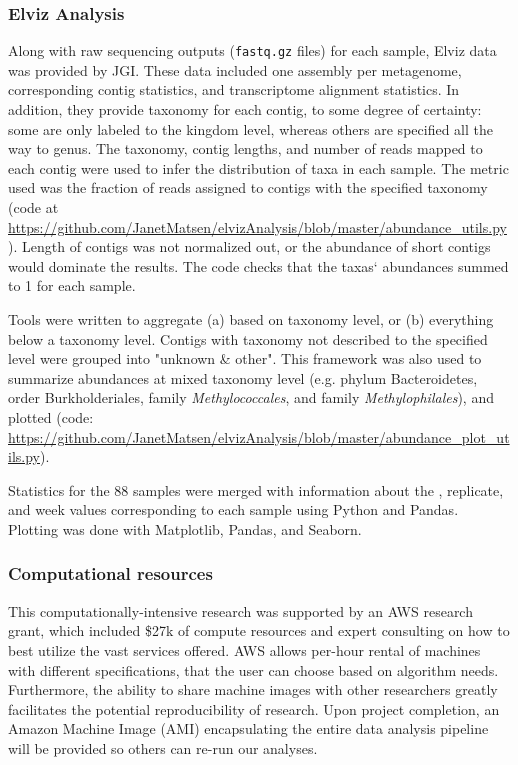 \subsubsection{Elviz Analysis}
Along with raw sequencing outputs (\texttt{fastq.gz} files) for each sample, Elviz data \cite{cantor2015} was provided by JGI.
These data included one assembly per metagenome, corresponding contig statistics, and transcriptome alignment statistics.
In addition, they provide taxonomy for each contig, to some degree of certainty: some are only labeled to the kingdom level, whereas others are specified all the way to genus.
The taxonomy, contig lengths, and number of reads mapped to each contig were used to infer the distribution of taxa in each sample.
The metric used was the fraction of reads assigned to contigs with the specified taxonomy (code at \url{https://github.com/JanetMatsen/elvizAnalysis/blob/master/abundance_utils.py}).
Length of contigs was not normalized out, or the abundance of short contigs would dominate the results.
The code checks that the taxas` abundances summed to 1 for each sample.

Tools were written to aggregate (a) based on taxonomy level, or (b) everything below a taxonomy level.
Contigs with taxonomy not described to the specified level were grouped into "unknown \& other".
This framework was also used to summarize abundances at mixed taxonomy level (e.g. phylum Bacteroidetes, order Burkholderiales, family \textit{Methylococcales}, and family \textit{Methylophilales}), and plotted (code: \url{https://github.com/JanetMatsen/elvizAnalysis/blob/master/abundance_plot_utils.py}).

Statistics for the 88 samples were merged with information about the , replicate, and week values corresponding to each sample using Python and Pandas.
Plotting was done with Matplotlib, Pandas, and Seaborn.

\subsubsection{Computational resources}
This computationally-intensive research was supported by an AWS research grant, which included \$27k of compute resources and expert consulting on how to best utilize the vast services offered.
AWS allows per-hour rental of machines with different specifications, that the user can choose based on algorithm needs.
Furthermore, the ability to share machine images with other researchers greatly facilitates the potential reproducibility of research.
Upon project completion, an Amazon Machine Image (AMI) encapsulating the entire data analysis pipeline will be provided so others can re-run our analyses.

